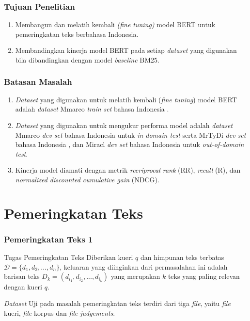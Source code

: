 \documentclass{beamer}
\newcommand{\f}[1]{\textit{#1}}
\begin{document}
\begin{frame}
    \frametitle{Tujuan Penelitian}
    \begin{enumerate}
        \item Membangun dan melatih kembali \f{(fine tuning)} model BERT untuk pemeringkatan teks berbahasa Indonesia.
        \item Membandingkan kinerja model BERT pada setiap \f{dataset} yang digunakan bila dibandingkan dengan model \f{baseline} BM25.
    \end{enumerate}
\end{frame}

\begin{frame}
    \frametitle{Batasan Masalah}
    \begin{enumerate}
    \item \f{Dataset} yang digunakan untuk melatih kembali (\f{fine tuning}) model BERT adalah \f{dataset} Mmarco \f{train set} bahasa Indonesia \citep{mmarco}.
	\item \f{Dataset} yang digunakan untuk mengukur performa model adalah \f{dataset} Mmarco \f{dev set} bahasa Indonesia \citep{mmarco} untuk \f{in-domain test} serta MrTyDi \f{dev set} bahasa Indonesia \citep{mrtydi}, dan Miracl \f{dev set} bahasa Indonesia \citep{miracl} untuk \f{out-of-domain test}.
	\item Kinerja model diamati dengan metrik \f{recriprocal rank} (RR), \f{recall} (R), dan \f{normalized discounted cumulative gain} (NDCG).
    \end{enumerate}
\end{frame}
    
\section{Pemeringkatan Teks}

\begin{frame}
\frametitle{Pemeringkatan Teks 1}

    \begin{block}{Tugas Pemeringkatan Teks}
        Diberikan kueri $q$ dan himpunan teks terbatas $\mathcal{D}= \{d_1, d_2, ..., d_n\}$, keluaran yang diinginkan dari permasalahan ini adalah barisan teks $D_k = (d_{i_1}, d_{i_2}, ..., d_{i_k})$ yang merupakan $k$ teks yang paling relevan dengan kueri $q$.
    \end{block}

    \noindent\f{Dataset} Uji pada masalah pemeringkatan teks terdiri dari tiga \f{file}, yaitu \f{file} kueri, \f{file} korpus dan \f{file judgements}.
\end{frame}
\end{document}
